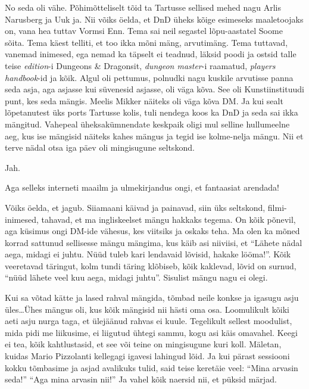 
No seda oli vähe. Põhimõtteliselt  tõid ta Tartusse sellised mehed nagu Arlis Narusberg ja Uuk ja. Nii võiks öelda, et DnD üheks kõige esimeseks maaletoojaks on, vana hea tuttav Vormsi Enn. Tema sai neil segastel lõpu-aastatel Soome sõita. Tema käest telliti, et too ikka mõni mäng, arvutimäng. Tema tuttavad, vanemad inimesed, ega nemad ka täpselt ei teadnud, läksid poodi ja ostsid talle teise \emph{edition}-i Dungeons \& Dragonsit, \emph{dungeon master}-i raamatud, \emph{players handbook}-id ja kõik. Algul oli pettumus, polnudki nagu kuskile arvutisse panna seda asja, aga asjasse kui süvenesid asjasse, oli väga kõva. See oli Kunstiinstituudi punt, kes seda mängis. Meelis Mikker näiteks oli väga kõva DM. Ja kui sealt lõpetanutest üks ports Tartusse kolis,  tuli nendega koos ka DnD ja seda sai ikka  mängitud. Vahepeal üheksakümnendate keskpaik oligi mul selline hullumeelne aeg, kus ise mängisid näiteks kahes mängus ja tegid ise kolme-nelja mängu. Nii et terve nädal otsa iga päev oli mingisugune seltskond.


Jah.
                 

Aga selleks interneti maailm ja ulmekirjandus ongi, et fantaasiat arendada!


Võiks öelda, et jagub. Siiamaani käivad ja painavad, siin üks seltskond, filmi-inimesed, tahavad, et ma ingliskeelset mängu hakkaks tegema. On kõik põnevil, aga küsimus ongi DM-ide vähesus, kes viitsiks ja oskaks teha. Ma olen ka mõned korrad sattunud sellisesse mängu mängima, kus käib asi niiviisi, et \enquote{Lähete nädal aega, midagi ei juhtu. Nüüd tuleb kari lendavaid lõvisid, hakake lööma!}. Kõik veeretavad täringut, kolm tundi täring klõbiseb, kõik kaklevad, lõvid on surnud, \enquote{nüüd lähete veel kuu aega, midagi juhtu}.  Sisulist mängu nagu ei olegi. 

Kui sa võtad kätte ja lased rahval mängida, tõmbad neile konkse ja igasugu asju üles\ldots Ühes mängus oli, kus kõik mängisid nii hästi oma osa. Loomulikult kõiki aeti asju nurga taga, et ülejäänud rahvas ei kuule. Tegelikult sellest moodulist, mida pidi me  liikusime, ei liigutud ühtegi sammu, kogu asi käis omavahel. Keegi ei tea, kõik kahtlustasid, et see või teine on mingisugune kuri koll. Mäletan, kuidas Mario Pizzolanti  kellegagi  igavesi lahingud lõid. Ja kui pärast sessiooni kokku tõmbasime ja asjad avalikuks tulid, said teise keretäie veel: \enquote{Mina arvasin seda!} \enquote{Aga mina arvasin nii!} Ja vahel kõik naersid nii, et püksid märjad. 

